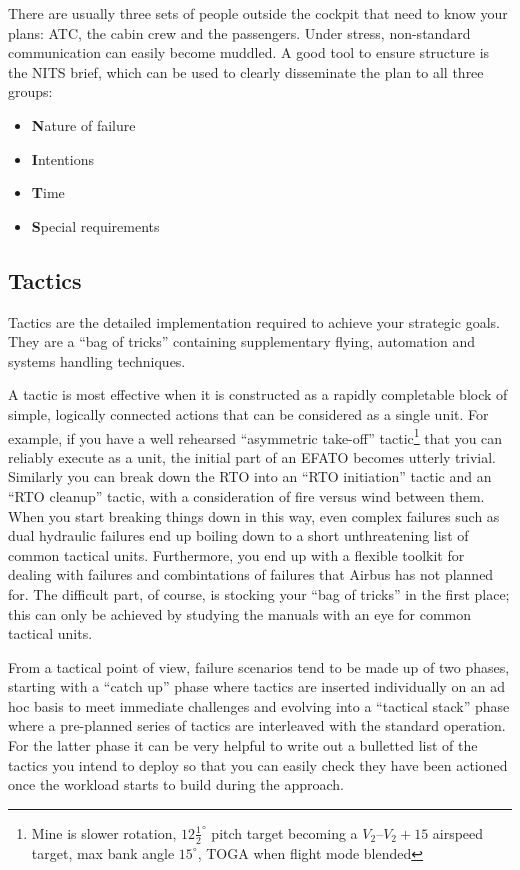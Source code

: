 \documentclass[a5paper,11pt,titlepage]{article}
\begin{document}
There are usually three sets of people outside the cockpit that need to
know your plans: ATC, the cabin crew and the passengers. Under stress,
non-standard communication can easily become muddled. A good tool to
ensure structure is the NITS brief, which can be used to clearly
disseminate the plan to all three groups:

\begin{itemize}
\item \textbf{N}ature of failure
\item \textbf{I}ntentions
\item \textbf{T}ime
\item \textbf{S}pecial requirements
\end{itemize}

\subsection{Tactics}

Tactics are the detailed implementation required to achieve your
strategic goals. They are a ``bag of tricks'' containing supplementary
flying, automation and systems handling techniques.

A tactic is most effective when it is constructed as a rapidly
completable block of simple, logically connected actions that can be
considered as a single unit. For example, if you have a well rehearsed
``asymmetric take-off'' tactic\footnote{Mine is slower rotation,
  $12\frac{1}{2}^\circ$ pitch target becoming a $V_2$--$V_2+15$ airspeed
  target, max bank angle $15^\circ$, TOGA when flight mode blended} that
you can reliably execute as a unit, the initial part of an EFATO becomes
utterly trivial. Similarly you can break down the RTO into an ``RTO
initiation'' tactic and an ``RTO cleanup'' tactic, with a consideration
of fire versus wind between them. When you start breaking things down in
this way, even complex failures such as dual hydraulic failures end up
boiling down to a short unthreatening list of common tactical
units. Furthermore, you end up with a flexible toolkit for dealing with
failures and combintations of failures that Airbus has not planned
for. The difficult part, of course, is stocking your ``bag of tricks''
in the first place; this can only be achieved by studying the manuals
with an eye for common tactical units.

From a tactical point of view, failure scenarios tend to be made up of
two phases, starting with a ``catch up'' phase where tactics are
inserted individually on an ad hoc basis to meet immediate challenges
and evolving into a ``tactical stack'' phase where a pre-planned series
of tactics are interleaved with the standard operation. For the latter
phase it can be very helpful to write out a bulletted list of the
tactics you intend to deploy so that you can easily check they have been
actioned once the workload starts to build during the approach.
\end{document}
